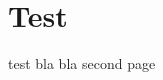 \documentclass{./include/pnp}
\begin{document}
	\FrontMatter

		
	\TableOfContents

	\MainMatter

	\chapter{Test}
	test bla bla
	\newpage
	second page
\end{document}
